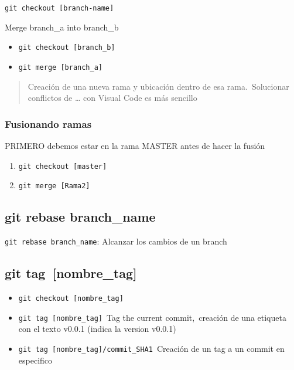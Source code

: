 \documentclass[
  a2paper,
]{article}
\providecommand{\tightlist}{%
  \setlength{\itemsep}{0pt}\setlength{\parskip}{0pt}}\usepackage{longtable,booktabs,array}
\begin{document}
\texttt{git\ checkout~{[}branch-name{]}}~~

Merge branch\_a into branch\_b

\begin{itemize}
\tightlist
\item
  \texttt{git\ checkout~{[}branch\_b{]}}
\item
  \texttt{git\ merge~{[}branch\_a{]}}
\end{itemize}

\begin{quote}
Creación de una nueva rama y ubicación dentro de esa rama.~Solucionar
conflictos de \ldots{} con Visual Code es más sencillo
\end{quote}

\hypertarget{fusionando-ramas}{%
\subsubsection{Fusionando ramas}\label{fusionando-ramas}}

PRIMERO debemos estar en la rama MASTER antes de hacer la fusión

\begin{enumerate}
\def\labelenumi{\arabic{enumi}.}
\tightlist
\item
  \texttt{git\ checkout~{[}master{]}}
\item
  \texttt{git\ merge~{[}Rama2{]}}
\end{enumerate}

\hypertarget{git-rebase-branch_name}{%
\subsection{git rebase branch\_name}\label{git-rebase-branch_name}}

\texttt{git\ rebase\ branch\_name}: Alcanzar los cambios de un branch

\hypertarget{git-tag-nombre_tag}{%
\subsection{git tag~{[}nombre\_tag{]}~~}\label{git-tag-nombre_tag}}

\begin{itemize}
\item
  \texttt{git\ checkout~{[}nombre\_tag{]}}
\item
  \texttt{git\ tag\ {[}nombre\_tag{]}}~Tag the current commit,~creación
  de una etiqueta con el texto v0.0.1 (indica la version v0.0.1)
\item
  \texttt{git\ tag~{[}nombre\_tag{]}/commit\_SHA1}~Creación de un tag a
  un commit en especifico~~
\end{itemize}
\end{document}
